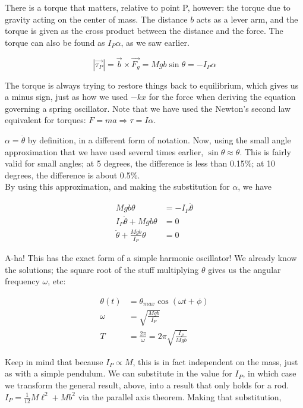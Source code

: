 \documentclass[12pt,a4paper]{report}
\begin{document}
There is a torque that matters, relative to point P, however: the torque due to gravity acting on the center of mass. The distance $b$ acts as a lever arm, and the torque is given as the cross product between the distance and the force. The torque can also be found as $I_P \alpha$, as we saw earlier.

\begin{equation}
|\vec{\tau_P}| = \vec{b} \times \vec{F_g} = M g b \sin \theta = - I_P \alpha
\end{equation}

The torque is always trying to restore things back to equilibrium, which gives us a minus sign, just as how we used $- k x$ for the force when deriving the equation governing a spring oscillator. Note that we have used the Newton's second law equivalent for torques: $F = m a \Rightarrow \tau = I \alpha$.

$\alpha = \ddot{\theta}$ by definition, in a different form of notation. Now, using the small angle approximation that we have used several times earlier, $\sin \theta \approx \theta$. This is fairly valid for small angles; at 5 degrees, the difference is less than 0.15\%; at 10 degrees, the difference is about 0.5\%.\\
By using this approximation, and making the substitution for $\alpha$, we have

\begin{align}
M g b \theta &= - I_P \ddot{\theta}\\
I_P \ddot{\theta} + M g b \theta &= 0\\
\ddot{\theta} + \frac{M g b}{I_P} \theta &= 0
\end{align}

A-ha! This has the exact form of a simple harmonic oscillator! We already know the solutions; the square root of the stuff multiplying $\theta$ gives us the angular frequency $\omega$, etc:

\begin{align}
\theta(t) &= \theta_{max} \cos(\omega t + \phi)\\
\omega    &= \sqrt{\frac{M g b}{I_P}}\\
T         &= \frac{2 \pi}{\omega} = 2 \pi \sqrt{\frac{I_P}{M g b}}
\end{align}

Keep in mind that because $I_P \propto M$, this is in fact independent on the mass, just as with a simple pendulum. We can substitute in the value for $I_P$, in which case we transform the general result, above, into a result that only holds for a rod.\\
$I_P = \frac{1}{12} M \ell^2 + M b^2$ via the parallel axis theorem. Making that substitution,
\end{document}
